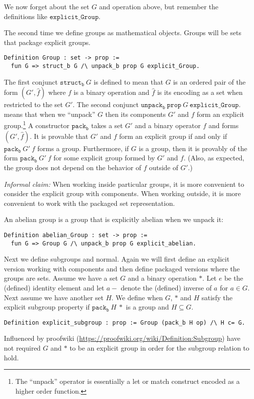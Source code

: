 \documentclass{article}
\begin{document}
We now forget about the set $G$ and operation above, but
remember the definitions like ${\mathtt{explicit\_Group}}$.

The second time we define groups as mathematical objects.
Groups will be sets that package explicit groups.
\begin{verbatim}
Definition Group : set -> prop :=
  fun G => struct_b G /\ unpack_b prop G explicit_Group.
\end{verbatim}
The first conjunct $\mathtt{struct_b}~G$ is defined to mean
that $G$ is an ordered pair of the form $(G',\hat{f})$ where $f$ is a
binary operation and $\hat{f}$ is its encoding as a set when restricted to the set $G'$.
The second conjunct $\mathtt{unpack_b}~\mathtt{prop}~G~\mathtt{explicit\_Group}$.
means that when we ``unpack'' $G$ then its components $G'$ and $f$
form an explicit group.\footnote{The ``unpack'' operator is essentially a let or match construct encoded as a higher order function.}
A constructor $\mathtt{pack_b}$ takes a set $G'$ and a binary operator $f$ and forms $(G',\hat{f})$.
It is provable that $G'$ and $f$ form an explicit group if and only if $\mathtt{pack_b}~G'~f$
forms a group. Furthermore, if $G$ is a group, then it is provably of the form $\mathtt{pack_b}~G'~f$
for some explicit group formed by $G'$ and $f$. (Also, as expected, the group does not depend on the
behavior of $f$ outside of $G'$.)

{\it{Informal claim:}} When working inside particular groups, it is
more convenient to consider the explicit group with components. When
working outside, it is more convenient to work with the packaged set
representation.

An abelian group is a group that is explicitly abelian when we unpack it:
\begin{verbatim}
Definition abelian_Group : set -> prop :=
  fun G => Group G /\ unpack_b prop G explicit_abelian.
\end{verbatim}

Next we define subgroups and normal. Again we will first define an explicit version
working with components and then define packaged versions where the groups are sets.
Assume we have a set $G$ and a binary operation $*$.
Let $e$ be the (defined) identity element and let $a-$ denote the (defined) inverse of $a$
for $a\in G$.
Next assume we have another set $H$. We define when $G$, $*$ and $H$ satisfy the explicit subgroup property
if $\mathtt{pack_b}~H~*$ is a group and $H\subseteq G$.
\begin{verbatim}
Definition explicit_subgroup : prop := Group (pack_b H op) /\ H c= G.
\end{verbatim}
Influenced by proofwiki (\url{https://proofwiki.org/wiki/Definition:Subgroup}) have not required $G$ and $*$ to be an
explicit group in order for the subgroup relation to hold.
\end{document}
